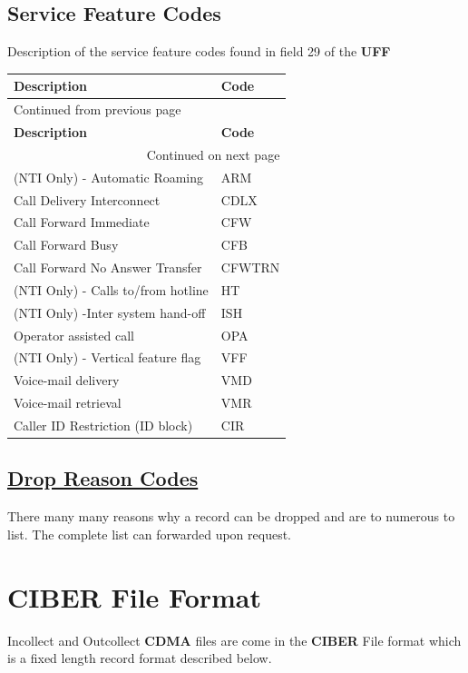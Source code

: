 \documentclass[12pt,twoside]{article}
\begin{document}
\subsection{Service Feature Codes}
\label{sec:orgheadline16}
Description of the service feature codes found in field 29 of the \textbf{UFF}
\footnotesize
\begin{longtable}{l|l}
\hline
\textbf{Description} & \textbf{Code}\\
\hline
\endfirsthead
\multicolumn{2}{l}{Continued from previous page} \\
\hline

\textbf{Description} & \textbf{Code} \\

\hline
\endhead
\hline\multicolumn{2}{r}{Continued on next page} \\
\endfoot
\endlastfoot
\hline
(NTI Only) - Automatic Roaming & ARM\\
Call Delivery Interconnect & CDLX\\
Call Forward Immediate & CFW\\
Call Forward Busy & CFB\\
Call Forward No Answer Transfer & CFWTRN\\
(NTI Only) - Calls to/from hotline & HT\\
(NTI Only) -Inter system hand-off & ISH\\
Operator assisted call & OPA\\
(NTI Only) - Vertical feature flag & VFF\\
Voice-mail delivery & VMD\\
Voice-mail retrieval & VMR\\
Caller ID Restriction (ID block) & CIR\\
\hline
\end{longtable}
\normalsize
\subsection{\href{docs/Drop\%20Reason\%20Codes.pdf}{Drop Reason Codes}}
\label{sec:orgheadline17}
There many many reasons why a record can be dropped and are to numerous to list. The complete list can forwarded upon request.

\newpage
\section{CIBER File Format}
\label{sec:orgheadline27}
Incollect and Outcollect \textbf{CDMA} files are come in the \textbf{CIBER} File format which is a fixed length record format described below.
\end{document}
